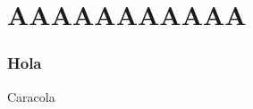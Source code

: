 \documentclass[10pt]{report}
\begin{document}
	\part{AAAAAAAAAAA}
	\section{Hola}
	Caracola
\end{document}
